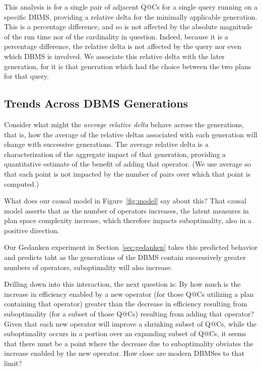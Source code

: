 \documentclass[prodmode,acmtods]{acmsmall}
\begin{document}
This analysis is for a single pair of adjacent Q@Cs for a single query
running on a specific \hbox{DBMS},
providing a relative delta for the minimally applicable generation. This is a percentage difference, and so is not \hbox{affected}
by the absolute magnitude of the run time nor of the cardinality in
question. Indeed, because it is a percentage difference, the relative delta
is not affected by the query nor even which \hbox{DBMS} is involved. We associate
this relative delta with the later generation, for it is that generation
which had the choice between the two plans for that query.

\subsection{Trends Across \hbox{DBMS} Generations}
Consider what might the {\em average relative delta} behave across the
generations, that is, how
the average of the relative deltas associated with each generation will
change with successive generations.
The average relative delta is a characterization of the aggregate
impact of that generation, providing a quantitative estimate of the benefit
of adding that operator. (We use average so that each point is not impacted
by the number of pairs over which that point is computed.) 

What does our causal model in Figure~\ref{fig:model} say about this? That
causal model asserts that as the number of operators increases, the latent
measures in plan space complexity increase, which therefore impacts
suboptimality, also in a positive direction.

Our Gedanken experiment in
Section~\ref{sec:gedanken} takes this predicted behavior and predicts taht
as the generations of the \hbox{DBMS} contain successively greater numbers of
operators, suboptimality will also increase.

Drilling down into this interaction, the next question is:   By
how much is the increase in efficiency enabled by a new operator (for those
Q@Cs utilizing a plan containing that operator) greater than the decrease in
efficiency resulting from suboptimality (for a subset of those Q@Cs)
resulting from adding that operator?  Given that each new operator will
improve a shrinking subset of Q@Cs, while the suboptimality occurs in a
portion over an expanding subset of Q@Cs, it seems that there must be a
point where the decrease due to suboptimality obviates the increase enabled
by the new operator. How close are modern \hbox{DBMSes} to that limit?
\end{document}
